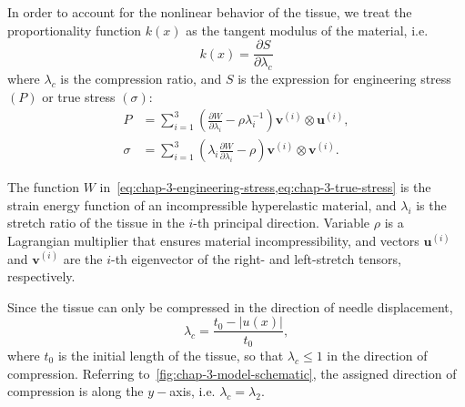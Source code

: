 In order to account for the nonlinear behavior of the tissue, we treat the proportionality function $k(x)$ as the tangent modulus of the material, i.e.
\begin{equation}
  \label{eq:chap-3-tangent-modulus}
  k(x) = \frac{\partial S}{\partial \lambda_c}
\end{equation}
where $\lambda_c$ is the compression ratio, and $S$ is the expression for engineering stress $(P)$ or true stress $(\sigma)$:
\begin{align}
  P &= \sum_{i = 1}^3\left(\frac{\partial W}{\partial \lambda_i} - \rho \lambda_i^{-1}\right)\textbf{v}^{(i)} \otimes \textbf{u}^{(i)},    \label{eq:chap-3-engineering-stress} \\
    \sigma & = \sum_{i = 1}^3\left(\lambda_i \frac{\partial W}{\partial \lambda_i} - \rho\right)\textbf{v}^{(i)} \otimes \textbf{v}^{(i)}.   \label{eq:chap-3-true-stress}
\end{align}

The function $W$ in~\cref{eq:chap-3-engineering-stress,eq:chap-3-true-stress} is the strain energy function of an incompressible hyperelastic material, and $\lambda_i$ is the stretch ratio of the tissue in the $i$-th principal direction. Variable $\rho$ is a Lagrangian multiplier that ensures material incompressibility, and vectors $\textbf{u}^{(i)}$ and $\textbf{v}^{(i)}$ are the $i$-th eigenvector of the right- and left-stretch tensors, respectively.

Since the tissue can only be compressed in the direction of needle displacement,
\begin{equation}
  \label{eq:chap-3-compression}
  \lambda_c = \frac{t_{0} - |u(x)|}{t_{0}},
\end{equation}
where $t_{0}$ is the initial length of the tissue, so that $\lambda_c \leq 1$ in the direction of compression. Referring to~\cref{fig:chap-3-model-schematic}, the assigned direction of compression is along the $y-$axis, i.e. $\lambda_c = \lambda_2$.

